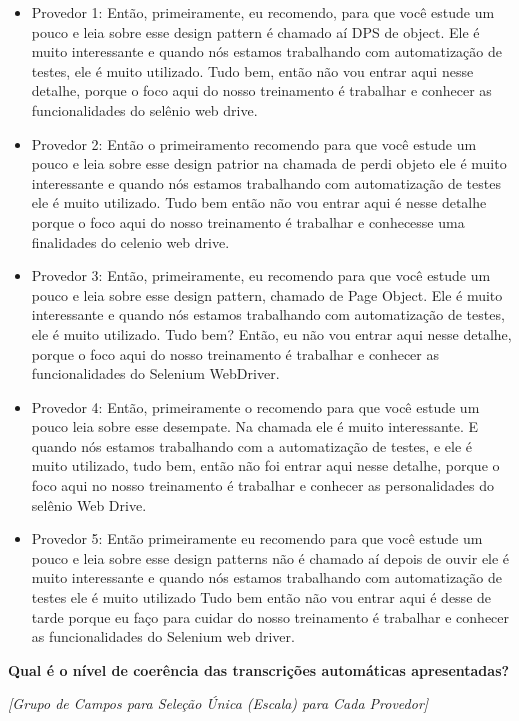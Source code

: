 \begin{itemize}
    \item Provedor 1: Então, primeiramente, eu recomendo, para que você estude um pouco e leia sobre esse design pattern é chamado aí DPS de object. Ele é muito interessante e quando nós estamos trabalhando com automatização de testes, ele é muito utilizado. Tudo bem, então não vou entrar aqui nesse detalhe, porque o foco aqui do nosso treinamento é trabalhar e conhecer as funcionalidades do selênio web drive.
    \item Provedor 2: Então o primeiramento recomendo para que você estude um pouco e leia sobre esse design patrior na chamada de perdi objeto ele é muito interessante e quando nós estamos trabalhando com automatização de testes ele é muito utilizado. Tudo bem então não vou entrar aqui é nesse detalhe porque o foco aqui do nosso treinamento é trabalhar e conhecesse uma finalidades do celenio web drive.
    \item Provedor 3: Então, primeiramente, eu recomendo para que você estude um pouco e leia sobre esse design pattern, chamado de Page Object. Ele é muito interessante e quando nós estamos trabalhando com automatização de testes, ele é muito utilizado. Tudo bem? Então, eu não vou entrar aqui nesse detalhe, porque o foco aqui do nosso treinamento é trabalhar e conhecer as funcionalidades do Selenium WebDriver.
    \item Provedor 4: Então, primeiramente o recomendo para que você estude um pouco leia sobre esse desempate. Na chamada ele é muito interessante. E quando nós estamos trabalhando com a automatização de testes, e ele é muito utilizado, tudo bem, então não foi entrar aqui nesse detalhe, porque o foco aqui no nosso treinamento é trabalhar e conhecer as personalidades do selênio Web Drive.
    \item Provedor 5: Então primeiramente eu recomendo para que você estude um pouco e leia sobre esse design patterns não é chamado aí depois de ouvir ele é muito interessante e quando nós estamos trabalhando com automatização de testes ele é muito utilizado Tudo bem então não vou entrar aqui é desse de tarde porque eu faço para cuidar do nosso treinamento é trabalhar e conhecer as funcionalidades do Selenium web driver.
\end{itemize}

\noindent
\textbf{Qual é o nível de coerência das transcrições automáticas apresentadas?}

\noindent
\textit{[Grupo de Campos para Seleção Única (Escala) para Cada Provedor]}

